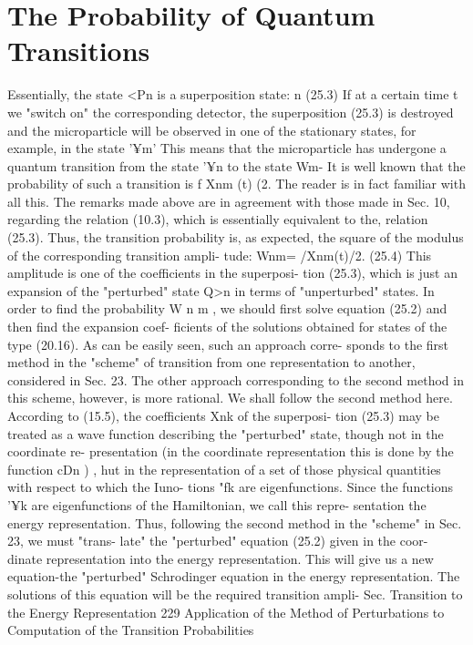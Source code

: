 \documentclass[a4paper,sfsidenotes,colorlinks=true]{tufte-book}
\numberwithin{equation}{section}
\numberwithin{figure}{section}
\begin{document}
{{{{{{\section{The Probability of Quantum Transitions}
Essentially, the state <Pn is a superposition state: n
(25.3)
If at a certain time t we "switch on" the corresponding detector, the superposition (25.3) is destroyed and the microparticle will be observed in one of the stationary states, for example, in the state '¥m' This means that the microparticle has undergone a quantum transition from the state '¥n to the state Wm- It is well known that the probability of such a transition is f Xnm (t) (2.
The reader is in fact familiar with all this. The remarks made above are in agreement with those made in Sec. 10, regarding the relation (10.3), which is essentially equivalent to the, relation (25.3).
Thus, the transition probability is, as expected, the square of the modulus of the corresponding transition ampli- tude:
Wnm= /Xnm(t)/2.	(25.4)
This amplitude is one of the coefficients in the superposi- tion (25.3), which is just an expansion of the "perturbed" state Q>n in terms of "unperturbed" states.
In	order	to	find	the	probability	W n m ,	we	should	first solve equation (25.2) and then find the expansion coef- ficients of the solutions obtained for states of the type (20.16). As can be easily seen, such an approach corre- sponds to the first method in the "scheme" of transition from one representation to another, considered in Sec. 23. The other approach corresponding to the second method in this scheme, however, is more rational. We shall follow the second method here.
According to (15.5), the coefficients Xnk of the superposi- tion (25.3) may be treated as a wave function describing the "perturbed" state, though not in the coordinate re- presentation (in the coordinate representation this is done by the function cDn ) , hut in the representation of a set of those physical quantities with respect to which the Iuno- tions "fk are eigenfunctions. Since the functions '¥k are eigenfunctions of the Hamiltonian, we call this repre- sentation the energy representation. Thus, following the second method in the "scheme" in Sec. 23, we must "trans- late" the "perturbed" equation (25.2) given in the coor- dinate representation into the energy representation. This will give us a new equation-the "perturbed" Schrodinger equation in the energy representation. The solutions of this equation will be the required transition ampli-
Sec.
Transition to the Energy Representation
229
Application of the Method of Perturbations to Computation of the Transition Probabilities
}}}}}}
\end{document}
